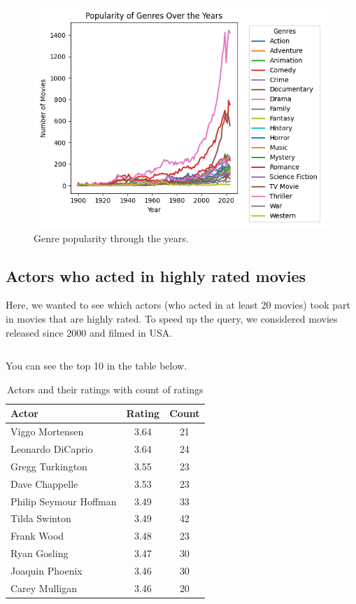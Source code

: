 \documentclass{Configuration_Files/PoliMi3i_thesis}
\begin{document}
\begin{figure}[H]
  \centering
  \includegraphics[width=\textwidth]{latex/letterboxd/visualization/genre_popularity.png}
  \caption{Genre popularity through the years.}
  \label{fig:genre_popularity}
\end{figure}

\subsection{Actors who acted in highly rated movies}

Here, we wanted to see which actors (who acted in at least 20 movies) took part in movies that are highly rated. To speed up the query, we considered movies released since 2000 and filmed in USA.

\inputminted[frame=single,framesep=10pt,breaklines]{cypher}{letterboxd/queries/query6.cypher}

You can see the top 10 in the table below.

\begin{table}[h!]
\centering
\begin{tabular}{|l|c|c|}
\hline
\textbf{Actor} & \textbf{Rating} & \textbf{Count} \\ \hline
Viggo Mortensen & 3.64 & 21 \\ \hline
Leonardo DiCaprio & 3.64 & 24 \\ \hline
Gregg Turkington & 3.55 & 23 \\ \hline
Dave Chappelle & 3.53 & 23 \\ \hline
Philip Seymour Hoffman & 3.49 & 33 \\ \hline
Tilda Swinton & 3.49 & 42 \\ \hline
Frank Wood & 3.48 & 23 \\ \hline
Ryan Gosling & 3.47 & 30 \\ \hline
Joaquin Phoenix & 3.46 & 30 \\ \hline
Carey Mulligan & 3.46 & 20 \\ \hline
\end{tabular}
\caption{Actors and their ratings with count of ratings}
\label{tab:actor_ratings}
\end{table}
\end{document}

